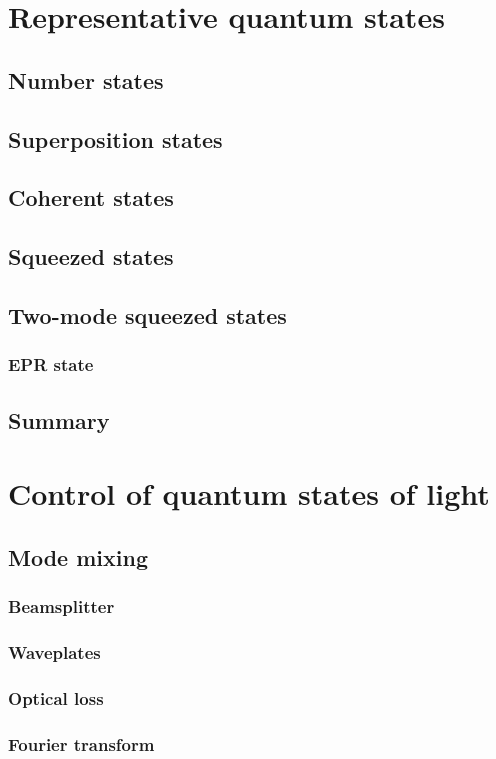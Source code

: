 \documentclass{book}
\begin{document}
\chapter{Representative quantum states}
\section{Number states}
\section{Superposition states}
\section{Coherent states}
\section{Squeezed states}
\section{Two-mode squeezed states}
\subsection{EPR state}
\section{Summary}

\chapter{Control of quantum states of light}
\section{Mode mixing}
\subsection{Beamsplitter}
\subsection{Waveplates}
\subsection{Optical loss}
\subsection{Fourier transform}
\end{document}
